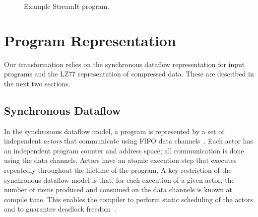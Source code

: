 \newcommand{\x}{\hspace{1.3pt}} %
\newcommand{\concat}[0]{\bullet}               %
\newcommand{\name}[1]{~~\hfill\framebox{#1}}   %

\newcommand{\skiptop}[0]{\vspace{-13pt}\\}   %
\newcommand{\skiptopa}[0]{\vspace{-1pt}\\}   %
\newcommand{\skiptopb}[0]{\vspace{-3pt}\\}   %
\newcommand{\skipbot}[0]{\vspace{-3pt}\\}    %

\newcommand{\tup}[2]{\langle#1, #2\rangle}


\begin{figure}[t]
\caption{Example StreamIt program.
\protect\label{fig:streamit}}
\end{figure}

\section{Program Representation}

Our transformation relies on the synchronous dataflow representation
for input programs and the LZ77 representation of compressed data.
These are described in the next two sections.

\subsection{Synchronous Dataflow}

In the synchronous dataflow model, a program is represented by a set
of independent {\it actors} that communicate using FIFO data
channels~\cite{LM87-i}.  Each actor has an independent program counter
and address space; all communication is done using the data channels.
Actors have an atomic execution step that executes repeatedly
throughout the lifetime of the program.  A key restriction of the
synchronous dataflow model is that, for each execution of a given
actor, the number of items produced and consumed on the data channels
is known at compile time.  This enables the compiler to perform static
scheduling of the actors and to guarantee deadlock freedom~\cite{LM87-i}.

